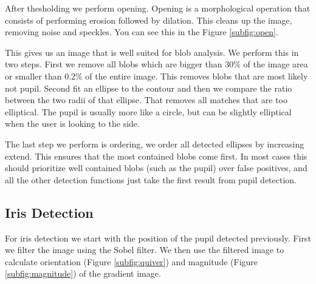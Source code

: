 After thesholding we perform opening. Opening is a morphological operation that consists of performing erosion followed by dilation. This cleans up the image, removing noise and speckles. You can see this in the Figure \ref{subfig:open}.

This gives us an image that is well suited for blob analysis. We perform this in two steps. First we remove all blobs which are bigger than 30\% of the image area or smaller than 0.2\% of the entire image. This removes blobs that are most likely not pupil. Second fit an ellipse to the contour and then we compare the ratio between the two radii of that ellipse. That removes all matches that are too elliptical. The pupil is usually more like a circle, but can be slightly elliptical when the user is looking to the side.

The last step we perform is ordering, we order all detected ellipses by increasing extend. This ensures that the most contained blobs come first. In most cases this should prioritize well contained blobs (such as the pupil) over false positives, and all the other detection functions just take the first result from pupil detection.

\subsection{Iris Detection}

For iris detection we start with the position of the pupil detected previously. First we filter the image using the Sobel filter. We then use the filtered image to calculate orientation (Figure \ref{subfig:quiver}) and magnitude (Figure \ref{subfig:magnitude}) of the gradient image. 

